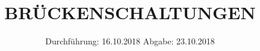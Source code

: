 

\subject{Versuchsprotokoll zum Versuch Nr. 302}
\title{BRÜCKENSCHALTUNGEN}
\date{
  Durchführung: 16.10.2018
  \hspace{3em}
  Abgabe: 23.10.2018
}



\maketitle
\thispagestyle{empty}
\tableofcontents
\newpage









\printbibliography{}


